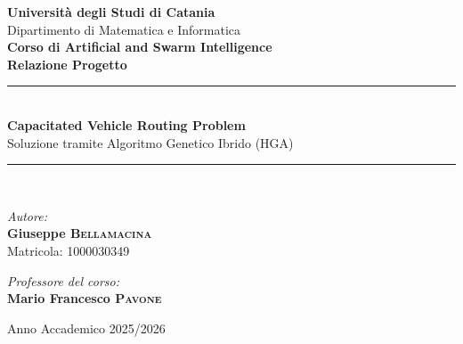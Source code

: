 \begin{titlepage}
    \centering
    \vspace*{2cm}

    {\LARGE \textbf{Universit\`a degli Studi di Catania}}\\[0.5cm]
    {\large Dipartimento di Matematica e Informatica}\\[2.5cm]
    {\Large \textbf{Corso di Artificial and Swarm Intelligence}}\\[0.3cm]
    {\Large \textbf{Relazione Progetto}}\\[2cm]

    \rule{\linewidth}{0.5mm}\\[0.4cm]
    {\huge \bfseries Capacitated Vehicle Routing Problem}\\[0.2cm]
    {\Large Soluzione tramite Algoritmo Genetico Ibrido (HGA)}\\[0.4cm]
    \rule{\linewidth}{0.5mm}\\[3cm]

    \vfill

    \begin{minipage}{0.4\textwidth}
        \begin{flushleft}
            \large
            \textit{Autore:}\\
            \textbf{Giuseppe \textsc{Bellamacina}}\\
            Matricola: 1000030349
        \end{flushleft}
    \end{minipage}
    \hfill
    \begin{minipage}{0.4\textwidth}
        \begin{flushright}
            \large
            \textit{Professore del corso:}\\
            \textbf{Mario Francesco \textsc{Pavone}}\\
        \end{flushright}
    \end{minipage}

    \vspace{2cm}

    {\large Anno Accademico 2025/2026}
\end{titlepage}
